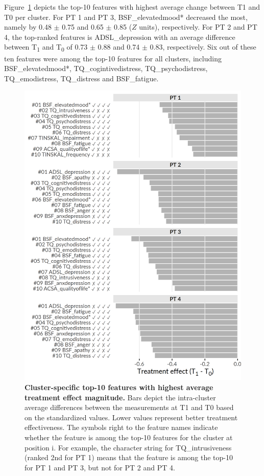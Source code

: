 \documentclass[
  oneside]{book}
\begin{document}
Figure~\ref{fig:06-treatment-effects} depicts the top-10 features with highest average change between T1 and T0 per cluster.
For PT 1 and PT 3, BSF\_elevatedmood* decreased the most, namely by 0.48 \(\pm\) 0.75 and 0.65 \(\pm\) 0.85 (\(Z\) units), respectively.
For PT 2 and PT 4, the top-ranked features is ADSL\_depression with an average difference between T\textsubscript{1} and T\textsubscript{0} of 0.73 \(\pm\) 0.88 and 0.74 \(\pm\) 0.83, respectively.
Six out of these ten features were among the top-10 features for all clusters, including BSF\_elevatedmood*, TQ\_cogintivedistress, TQ\_psychodistress, TQ\_emodistress, TQ\_distress and BSF\_fatigue.



\begin{figure}[h]

{\centering \includegraphics[width=0.643\linewidth]{figures/06-treatment-effects} 

}

\caption{\textbf{Cluster-specific top-10 features with highest average treatment effect magnitude.} Bars depict the intra-cluster average differences between the measurements at T1 and T0 based on the standardized values. Lower values represent better treatment effectiveness. The symbols right to the feature names indicate whether the feature is among the top-10 features for the cluster at position i. For example, the character string     for TQ\_intrusiveness (ranked 2nd for PT 1) means that the feature is among the top-10 for PT 1 and PT 3, but not for PT 2 and PT 4.}\label{fig:06-treatment-effects}
\end{figure}
\end{document}
